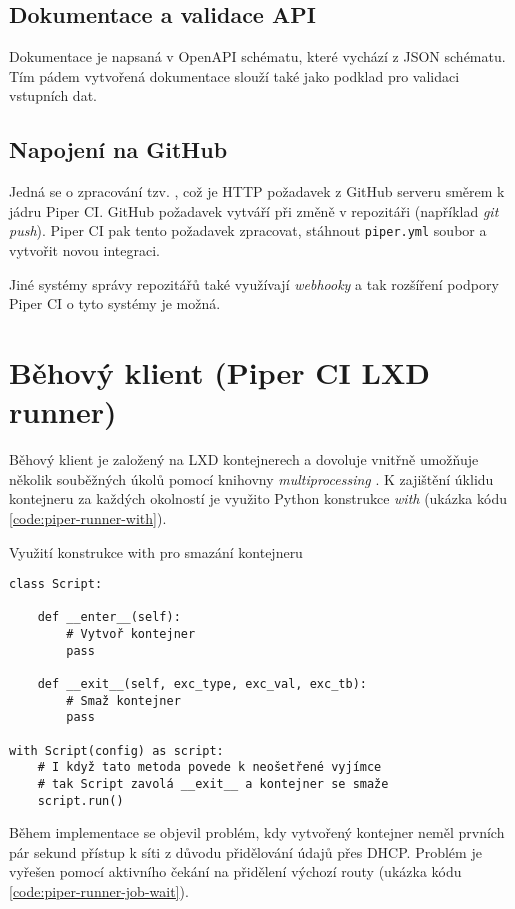 \subsection{Dokumentace a validace API}

Dokumentace je napsaná v OpenAPI schématu, které vychází z JSON schématu.
Tím pádem vytvořená dokumentace slouží také jako podklad pro validaci vstupních dat.

\subsection{Napojení na GitHub}

Jedná se o zpracování tzv. , což je HTTP požadavek z GitHub serveru směrem k jádru Piper CI.
GitHub požadavek vytváří při změně v repozitáři (například \textit{git push}).
Piper CI pak tento požadavek zpracovat, stáhnout \verb|piper.yml| soubor a vytvořit novou integraci.

Jiné systémy správy repozitářů také využívají \textit{webhooky} a tak rozšíření podpory Piper CI o tyto systémy je možná.

\section{Běhový klient (Piper CI LXD runner)}

Běhový klient je založený na LXD kontejnerech a dovoluje vnitřně umožňuje několik souběžných úkolů pomocí knihovny \textit{multiprocessing} \cite{python_multiprocessing}.
K zajištění úklidu kontejneru za každých okolností je využito Python konstrukce \textit{with} (ukázka kódu \ref{code:piper-runner-with}).

\begin{listing}[ht]
\caption{\label{code:piper-runner-with}Využití konstrukce with pro smazání kontejneru}
\begin{verbatim}
class Script:

    def __enter__(self):
        # Vytvoř kontejner
        pass

    def __exit__(self, exc_type, exc_val, exc_tb):
        # Smaž kontejner
        pass

with Script(config) as script:
    # I když tato metoda povede k neošetřené vyjímce
    # tak Script zavolá __exit__ a kontejner se smaže
    script.run()
\end{verbatim}
\end{listing}

Během implementace se objevil problém, kdy vytvořený kontejner neměl prvních pár sekund přístup k síti z důvodu přidělování údajů přes DHCP.
Problém je vyřešen pomocí aktivního čekání na přidělení výchozí routy (ukázka kódu \ref{code:piper-runner-job-wait}).

